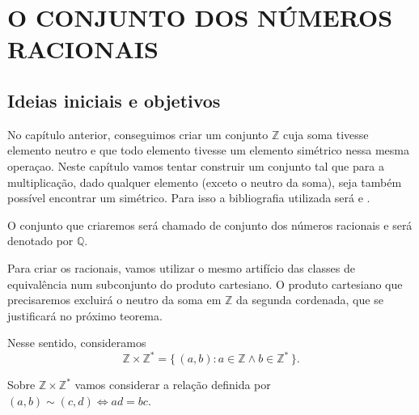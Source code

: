 \documentclass[../main.tex]{subfiles}
\begin{document}
\chapter{O CONJUNTO DOS NÚMEROS RACIONAIS}\label{cap-racionais}
\section{Ideias iniciais e objetivos}

No capítulo anterior, conseguimos criar um conjunto $\mathbb{Z}$ cuja soma tivesse elemento neutro e que todo elemento tivesse um elemento simétrico nessa mesma operaçao. Neste capítulo vamos tentar construir um conjunto tal que para a multiplicação, dado qualquer elemento (exceto o neutro da soma), seja também possível encontrar um simétrico. Para isso a bibliografia utilizada será \textcite{domingues-2009} e \textcite{ferreira}.

O conjunto que criaremos será chamado de conjunto dos números racionais e será denotado por $\mathbb{Q}$.

Para criar os racionais, vamos utilizar o mesmo artifício das classes de equivalência num subconjunto do produto cartesiano. O produto cartesiano que precisaremos excluirá o neutro da soma em $\mathbb{Z}$ da segunda cordenada, que se justificará no próximo teorema.

Nesse sentido, consideramos 
 \[ \mathbb{Z} \times \mathbb{Z}^* = \{\, \left( a,b \right) : a \in \mathbb{Z} \land b \in \mathbb{Z}^* \,\}. \]

Sobre $\mathbb{Z} \times \mathbb{Z}^*$ vamos considerar a relação definida por $\left( a,b \right) \sim \left( c,d \right) \iff ad = bc$.
\end{document}
